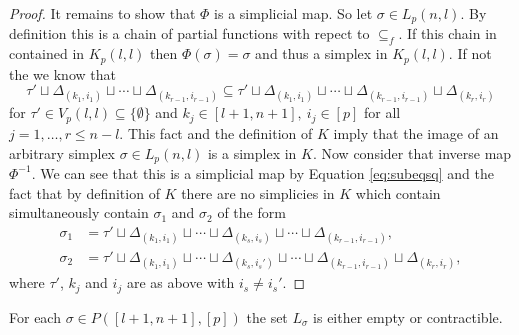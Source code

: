 \begin{proof}
    It remains to show that $\Phi$ is a simplicial map. So let $\sigma \in L_p(n,l)$. By definition this is a chain of partial functions with repect to $\subseteq_f$. If this chain in contained in $K_p(l,l)$ then $\Phi(\sigma) = \sigma$ and thus a simplex in $K_p(l,l)$.
    If not the we know that \begin{equation}\label{eq:subeqsq}
      \tau' \sqcup \Delta_{(k_1, i_1)} \sqcup \cdots \sqcup \Delta_{(k_{r-1}, i_{r-1})} \subseteq \tau' \sqcup \Delta_{(k_1, i_1)} \sqcup \cdots \sqcup \Delta_{(k_{r-1}, i_{r-1})} \sqcup \Delta_{(k_r, i_r)}
    \end{equation}
    for $\tau'\in V_p(l,l) \subseteq \{\emptyset\}$ and $k_j \in [l+1,n+1], \: i_j \in [p]$ for all $j=1,\ldots,r \leq n-l$. This fact and the definition of $K$ imply that the image of an arbitrary simplex $\sigma\in L_p(n,l)$ is a simplex in $K$. Now consider that inverse map $\Phi^{-1}$. We can see that this is a simplicial map by Equation \ref{eq:subeqsq} and the fact that by definition of $K$ there are no simplicies in $K$ which contain simultaneously contain $\sigma_1$ and $\sigma_2$ of the form
    \begin{align*}
\sigma_1 &= \tau' \sqcup \Delta_{(k_1, i_1)} \sqcup \cdots \sqcup \Delta_{(k_s, i_s)}\sqcup \cdots \sqcup \Delta_{(k_{r-1}, i_{r-1})},\\
\sigma_2 &= \tau' \sqcup \Delta_{(k_1, i_1)} \sqcup \cdots \sqcup \Delta_{(k_s, i_s')}\sqcup \cdots \sqcup \Delta_{(k_{r-1}, i_{r-1})} \sqcup \Delta_{(k_r, i_r)},
    \end{align*}
    where $\tau'$, $k_j$ and $i_j$ are as above with $i_s \neq i_s'$.
\end{proof}

\begin{lemma}\label{lem:Lsigsimeq}
  For each $\sigma \in P([l+1,n+1], [p])$ the set $L_\sigma$ is either empty or contractible.
\end{lemma}

